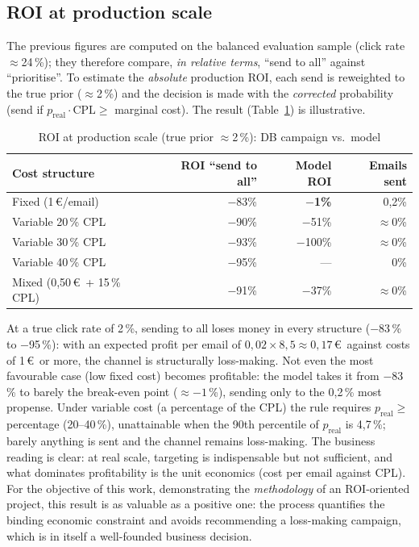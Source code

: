 \subsection{ROI at production scale}

The previous figures are computed on the balanced evaluation sample (click rate $\approx$24\,\%); they therefore compare, \emph{in relative terms}, ``send to all'' against ``prioritise''. To estimate the \emph{absolute} production ROI, each send is reweighted to the true prior ($\approx$2\,\%) and the decision is made with the \emph{corrected} probability (send if $p_\text{real}\cdot\text{CPL}\ge$ marginal cost). The result (Table~\ref{tab:roi_prod}) is illustrative.

\begin{table}[htbp]
\centering
\caption{ROI at production scale (true prior $\approx$2\,\%): DB campaign vs.\ model}
\label{tab:roi_prod}
\begin{tabular}{lrrr}
\toprule
\textbf{Cost structure} & \textbf{ROI ``send to all''} & \textbf{Model ROI} & \textbf{Emails sent} \\
\midrule
Fixed (1\,\euro/email)        & $-$83\% & \textbf{$-$1\%} & 0,2\% \\
Variable 20\,\% CPL           & $-$90\% & $-$51\%        & $\approx$0\% \\
Variable 30\,\% CPL           & $-$93\% & $-$100\%       & $\approx$0\% \\
Variable 40\,\% CPL           & $-$95\% & ---            & 0\% \\
Mixed (0,50\,\euro\ + 15\,\% CPL) & $-$91\% & $-$37\%   & $\approx$0\% \\
\bottomrule
\end{tabular}
\end{table}

At a true click rate of 2\,\%, sending to all loses money in every structure ($-$83\,\% to $-$95\,\%): with an expected profit per email of $0{,}02\times8{,}5\approx0{,}17$\,\euro\ against costs of 1\,\euro\ or more, the channel is structurally loss-making. Not even the most favourable case (low fixed cost) becomes profitable: the model takes it from $-$83\,\% to barely the break-even point ($\approx-1$\,\%), sending only to the 0,2\,\% most propense. Under variable cost (a percentage of the CPL) the rule requires $p_\text{real}\ge$ percentage (20--40\,\%), unattainable when the 90th percentile of $p_\text{real}$ is 4,7\,\%; barely anything is sent and the channel remains loss-making. The business reading is clear: at real scale, targeting is indispensable but not sufficient, and what dominates profitability is the unit economics (cost per email against CPL). For the objective of this work, demonstrating the \emph{methodology} of an ROI-oriented project, this result is as valuable as a positive one: the process quantifies the binding economic constraint and avoids recommending a loss-making campaign, which is in itself a well-founded business decision.
